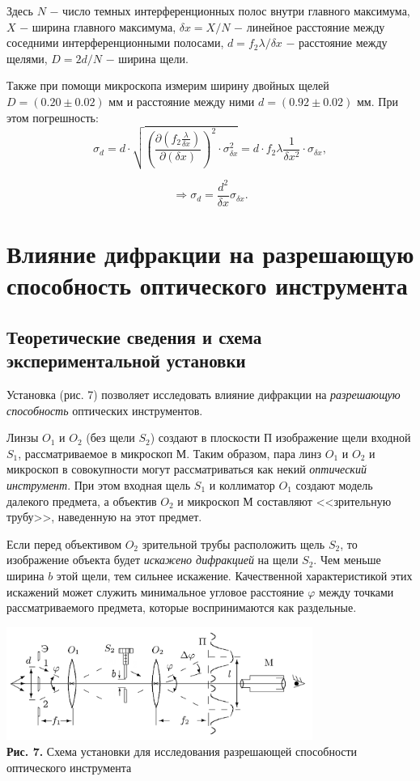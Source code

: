 \documentclass[a4paper,12pt]{article} %
\begin{document}
\hfill \break Здесь $N$ $-$ число темных интерференционных полос внутри главного максимума, $X$ $-$ ширина главного максимума, $\delta x = X/N$ $-$ линейное расстояние между соседними интерференционными полосами, $d = f_2 \lambda / \delta x$ $-$ расстояние между щелями, $D = 2d/N$ $-$ ширина щели.

\hfill \break Также при помощи микроскопа измерим ширину двойных щелей $D = (0.20 \pm 0.02)$ мм и расстояние между ними $d = (0.92 \pm 0.02)$ мм. При этом погрешность:
$$
\sigma_{d} = d \cdot \sqrt{ \left( \frac { \partial \left( f_2 \frac {\lambda} {\delta x} \right)} { \partial (\delta x) } \right)^2 \cdot \sigma_{\delta x}^2} = d \cdot f_2 \lambda \frac{1} {\delta x^2} \cdot \sigma_{\delta x},
$$

$$
\Rightarrow \sigma_{d} = \frac{d^2}{\delta x} \sigma_{\delta x}.
$$

\section{Влияние дифракции на разрешающую способность оптического инструмента}
\subsection{Теоретические сведения и схема экспериментальной установки}

\hfill \break Установка (рис. 7) позволяет исследовать влияние дифракции на \textit{разрешающую способность} оптических инструментов. 

\hfill \break Линзы $O_1$ и $O_2$ (без щели $S_2$) создают в плоскости П изображение щели входной $S_1$, рассматриваемое в микроскоп М. Таким образом, пара линз $O_1$ и $O_2$ и микроскоп в совокупности могут рассматриваться как некий \textit{оптический инструмент}. При этом входная щель $S_1$ и коллиматор $O_1$ создают модель далекого предмета, а объектив $O_2$ и микроскоп М составляют <<зрительную трубу>>, наведенную на этот предмет.

\hfill \break Если перед объективом $O_2$ зрительной трубы расположить щель $S_2$, то изображение объекта будет \textit{искажено дифракцией} на щели $S_2$. Чем меньше ширина $b$ этой щели, тем сильнее искажение. Качественной характеристикой этих искажений может служить минимальное угловое расстояние $\varphi$ между точками рассматриваемого предмета, которые воспринимаются как раздельные.

\begin{center}
\includegraphics[width=0.75\textwidth]{4.3.1_7.png}\\
\textbf{Рис. 7.} Схема установки для исследования разрешающей способности оптического инструмента \\
\end{center}
\end{document}
